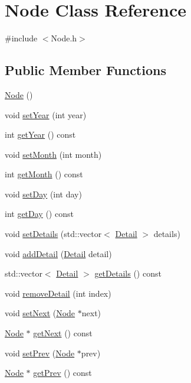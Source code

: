 \hypertarget{classNode}{\section{Node Class Reference}
\label{classNode}
}


{\ttfamily \#include $<$Node.\-h$>$}

\subsection*{Public Member Functions}
\begin{DoxyCompactItemize}
\item 
\hyperlink{classNode_ad7a34779cad45d997bfd6d3d8043c75f}{Node} ()
\item 
void \hyperlink{classNode_abd3420118a8a964e0678d1a975039e1f}{set\-Year} (int year)
\item 
int \hyperlink{classNode_af15e4c90d35d5664f635955e80f316ea}{get\-Year} () const 
\item 
void \hyperlink{classNode_ad8e3dddfff350a83c7f1026ffe346e62}{set\-Month} (int month)
\item 
int \hyperlink{classNode_a18e3c720f06e64b2cdcbef3b352a475b}{get\-Month} () const 
\item 
void \hyperlink{classNode_aa6c9c8301e00180ae43100eb9c1ac458}{set\-Day} (int day)
\item 
int \hyperlink{classNode_ae962d807d779d4fe8e4c297db3ce3466}{get\-Day} () const 
\item 
void \hyperlink{classNode_ac92cdd0b0fd1fb089ca345487cc9f131}{set\-Details} (std\-::vector$<$ \hyperlink{classDetail}{Detail} $>$ details)
\item 
void \hyperlink{classNode_ac80487a89a299a21570ab5674c15ed9c}{add\-Detail} (\hyperlink{classDetail}{Detail} detail)
\item 
std\-::vector$<$ \hyperlink{classDetail}{Detail} $>$ \hyperlink{classNode_a61140047453e85de625dbbd3fb80cdcf}{get\-Details} () const 
\item 
void \hyperlink{classNode_a1f233dbcd9ecd73c194b4e629ff08564}{remove\-Detail} (int index)
\item 
void \hyperlink{classNode_ae0062432733265c491000494625c3a04}{set\-Next} (\hyperlink{classNode}{Node} $\ast$next)
\item 
\hyperlink{classNode}{Node} $\ast$ \hyperlink{classNode_a62ad5aae1f815deafcf6095770dae6ca}{get\-Next} () const 
\item 
void \hyperlink{classNode_a169576a90ab0bd0706491c445616c909}{set\-Prev} (\hyperlink{classNode}{Node} $\ast$prev)
\item 
\hyperlink{classNode}{Node} $\ast$ \hyperlink{classNode_a63e648d1474c02f14c6147e7a96f430e}{get\-Prev} () const 
\end{DoxyCompactItemize}



